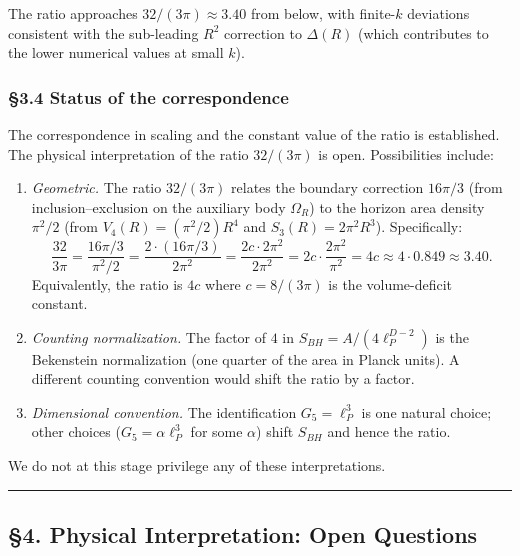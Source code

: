 \documentclass[a4paper,11pt]{article}
\theoremstyle{definition}
\begin{document}
The ratio approaches \(32/(3\pi) \approx 3.40\) from below, with
finite-\(k\) deviations consistent with the sub-leading \(R^2\)
correction to \(\Delta(R)\) (which contributes to the lower numerical
values at small \(k\)).

\subsubsection{§3.4 Status of the
correspondence}\label{status-of-the-correspondence}

The correspondence in scaling and the constant value of the ratio is
established. The physical interpretation of the ratio \(32/(3\pi)\) is
open. Possibilities include:

\begin{enumerate}
\def\labelenumi{\arabic{enumi}.}
\item
  \emph{Geometric.} The ratio \(32/(3\pi)\) relates the boundary
  correction \(16\pi/3\) (from inclusion--exclusion on the auxiliary
  body \(\Omega_R\)) to the horizon area density \(\pi^2/2\) (from
  \(V_4(R) = (\pi^2/2) R^4\) and \(S_3(R) = 2\pi^2 R^3\)). Specifically:
  \[\frac{32}{3\pi} = \frac{16\pi/3}{\pi^2/2} = \frac{2 \cdot (16\pi/3)}{2\pi^2} = \frac{2 c \cdot 2\pi^2}{2\pi^2} = 2 c \cdot \frac{2\pi^2}{\pi^2} = 4c \approx 4 \cdot 0.849 \approx 3.40.\]
  Equivalently, the ratio is \(4c\) where \(c = 8/(3\pi)\) is the
  volume-deficit constant.
\item
  \emph{Counting normalization.} The factor of \(4\) in
  \(S_{BH} = A/(4 \ell_P^{D-2})\) is the Bekenstein normalization (one
  quarter of the area in Planck units). A different counting convention
  would shift the ratio by a factor.
\item
  \emph{Dimensional convention.} The identification \(G_5 = \ell_P^3\)
  is one natural choice; other choices (\(G_5 = \alpha \ell_P^3\) for
  some \(\alpha\)) shift \(S_{BH}\) and hence the ratio.
\end{enumerate}

We do not at this stage privilege any of these interpretations.

\begin{center}\rule{0.5\linewidth}{0.5pt}\end{center}

\subsection{§4. Physical Interpretation: Open
Questions}\label{physical-interpretation-open-questions}
\end{document}
